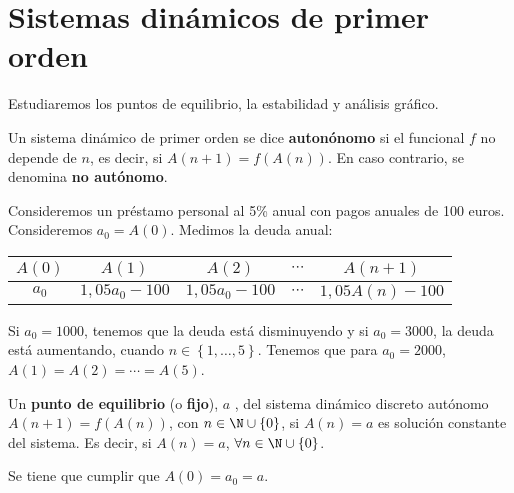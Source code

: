 \section{Sistemas dinámicos de primer orden}
Estudiaremos los puntos de equilibrio, la estabilidad y análisis gráfico. 
\begin{fdefinition}
\normalfont Un sistema dinámico de primer orden se dice \textbf{autonónomo} si el funcional $\displaystyle f $ no depende de $\displaystyle n $, es decir, si $\displaystyle A\left(n+1\right) = f\left(A\left(n\right)\right) $. En caso contrario, se denomina \textbf{no autónomo}.
\end{fdefinition}
\begin{eg}
\normalfont Consideremos un préstamo personal al 5\% anual con pagos anuales de 100 euros. Consideremos $\displaystyle a_{0} = A\left(0\right) $. Medimos la deuda anual:
\begin{center}
\begin{tabular}{|c|c|c|c|c|}
\hline 
$\displaystyle A\left(0\right) $ & $\displaystyle A\left(1\right) $ & $\displaystyle A\left(2\right) $ & $\displaystyle \cdots  $ & $\displaystyle A\left(n+1\right) $ \\
\hline 
$\displaystyle a_{0} $ & $\displaystyle 1,05a_{0}-100 $ & $\displaystyle 1,05a_{0}-100 $ & $\displaystyle \cdots  $ & $\displaystyle 1,05A\left(n\right)-100$ \\
\hline
\end{tabular}
\end{center}
Si $\displaystyle a_{0} = 1000 $, tenemos que la deuda está disminuyendo y si $\displaystyle a_{0} = 3000 $, la deuda está aumentando, cuando $\displaystyle n \in \left\{ 1, \ldots, 5\right\}  $. Tenemos que para $\displaystyle a_{0} = 2000 $, $\displaystyle A\left(1\right) = A\left(2\right) = \cdots = A\left(5\right) $.
\end{eg}
\begin{fdefinition}
	\normalfont Un \textbf{punto de equilibrio} (o \textbf{fijo}), $\displaystyle a $ , del sistema dinámico discreto autónomo $\displaystyle A\left(n+1\right) = f\left(A\left(n\right)\right) $, con $\displaystyle n \in \N \cup \left\{ 0\right\}  $, si $\displaystyle A\left(n\right) = a $ es solución constante del sistema. Es decir, si $\displaystyle A\left(n\right) = a $, $\displaystyle \forall n \in \N\cup \left\{ 0\right\}  $. 
\end{fdefinition}
\begin{observation}
\normalfont Se tiene que cumplir que $\displaystyle A\left(0\right) = a_{0}=a $.
\end{observation}
